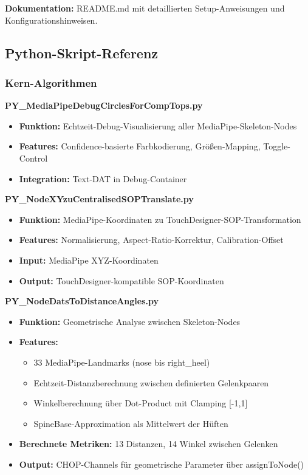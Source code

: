 \textbf{Dokumentation:} README.md mit detaillierten Setup-Anweisungen und Konfigurationshinweisen.

\subsection{Python-Skript-Referenz}

\subsubsection{Kern-Algorithmen}

\textbf{PY\_MediaPipeDebugCirclesForCompTops.py}
\begin{itemize}
    \item \textbf{Funktion:} Echtzeit-Debug-Visualisierung aller MediaPipe-Skeleton-Nodes
    \item \textbf{Features:} Confidence-basierte Farbkodierung, Größen-Mapping, Toggle-Control
    \item \textbf{Integration:} Text-DAT in Debug-Container
\end{itemize}

\textbf{PY\_NodeXYzuCentralisedSOPTranslate.py}
\begin{itemize}
    \item \textbf{Funktion:} MediaPipe-Koordinaten zu TouchDesigner-SOP-Transformation
    \item \textbf{Features:} Normalisierung, Aspect-Ratio-Korrektur, Calibration-Offset
    \item \textbf{Input:} MediaPipe XYZ-Koordinaten
    \item \textbf{Output:} TouchDesigner-kompatible SOP-Koordinaten
\end{itemize}

\textbf{PY\_NodeDatsToDistanceAngles.py}
\begin{itemize}
    \item \textbf{Funktion:} Geometrische Analyse zwischen Skeleton-Nodes
    \item \textbf{Features:} 
    \begin{itemize}
        \item 33 MediaPipe-Landmarks (nose bis right\_heel)
        \item Echtzeit-Distanzberechnung zwischen definierten Gelenkpaaren
        \item Winkelberechnung über Dot-Product mit Clamping [-1,1]
        \item SpineBase-Approximation als Mittelwert der Hüften
    \end{itemize}
    \item \textbf{Berechnete Metriken:} 13 Distanzen, 14 Winkel zwischen Gelenken
    \item \textbf{Output:} CHOP-Channels für geometrische Parameter über assignToNode()
\end{itemize}

